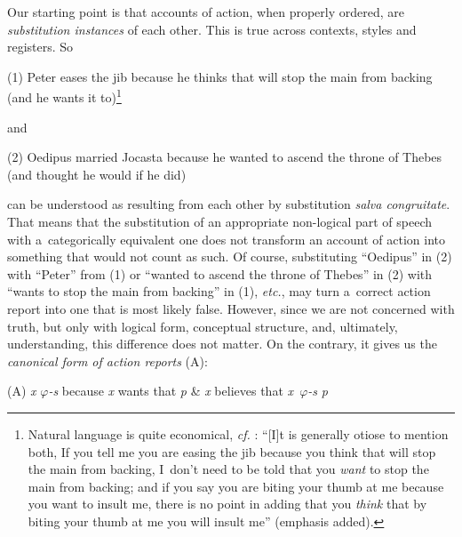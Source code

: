 Our starting point is that accounts of action, when properly ordered, are \textit{substitution instances} of each other. This is true across contexts, styles and registers. So



(1) Peter eases the jib because he thinks that will stop the main from backing (and he wants it to)\footnote{Natural language is quite economical, \textit{cf.} 
\parencite[][]{}: %
 ``[I]t is generally otiose to mention both, If you tell me you are easing the jib because you think that will stop the main from backing, I~don't need to be told that you \textit{want} to stop the main from backing; and if you say you are biting your thumb at me because you want to insult me, there is no point in adding that you \textit{think} that by biting your thumb at me you will insult me'' (emphasis added).}



and



(2) Oedipus married Jocasta because he wanted to ascend the throne of Thebes (and thought he would if he did)



can be understood as resulting from each other by substitution \textit{salva congruitate}. That means that the substitution of an appropriate non-logical part of speech with a~categorically equivalent one does not transform an account of action into something that would not count as such. Of course, substituting ``Oedipus'' in (2) with ``Peter'' from (1) or ``wanted to ascend the throne of Thebes'' in (2) with ``wants to stop the main from backing'' in (1), \textit{etc.}, may turn a~correct action report into one that is most likely false. However, since we are not concerned with truth, but only with logical form, conceptual structure, and, ultimately, understanding, this difference does not matter. On the contrary, it gives us the \textit{canonical form of action reports} (A):



(A) \textit{x} \textit{$\varphi $-s} because \textit{x} wants that \textit{p} \& \textit{x} believes that \textit{x~$\varphi $-s}  \textit{p}



